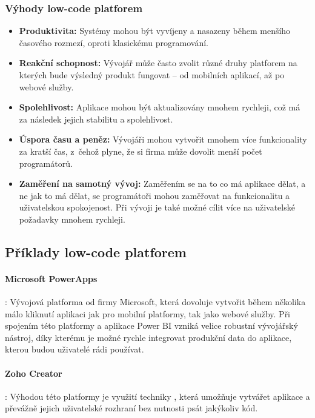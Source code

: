 \subsubsection{Výhody low-code platforem}
\begin{itemize}
\item \textbf{Produktivita:} Systémy mohou být vyvíjeny a nasazeny během menšího časového rozmezí, oproti klasickému programování. \cite{low-code-accelerate}
\item \textbf{Reakční schopnost:} Vývojář může často zvolit různé druhy platforem na kterých bude výsledný produkt fungovat -- od mobilních aplikací, až po webové služby. \cite{low-code-accelerate}
\item \textbf{Spolehlivost:} Aplikace mohou být aktualizovány mnohem rychleji, což má za následek jejich stabilitu a spolehlivost. \cite{low-code-accelerate}
\item \textbf{Úspora času a peněz:} Vývojáři mohou vytvořit mnohem více funkcionality za kratší čas, z~čehož plyne, že si firma může dovolit menší počet programátorů. \cite{low-code-accelerate}
\item \textbf{Zaměření na samotný vývoj:} Zaměřením se na to co má aplikace dělat, a ne jak to má dělat, se programátoři mohou zaměřovat na funkcionalitu a uživatelskou spokojenost. Při vývoji je také možné cílit více na uživatelské požadavky mnohem rychleji. \cite{low-code-accelerate}
\end{itemize}

\subsection{Příklady low-code platforem}
\paragraph{Microsoft PowerApps}: Vývojová platforma od firmy Microsoft, která dovoluje vytvořit během několika málo kliknutí aplikaci jak pro mobilní platformy, tak jako webové služby. Při spojením této platformy a aplikace Power BI vzniká velice robustní vývojářský nástroj, díky kterému je možné rychle integrovat produkční data do aplikace, kterou budou uživatelé rádi používat. \cite{pcmag-no-coding}
\paragraph{Zoho Creator}: Výhodou této platformy je využití techniky , která umožňuje vytvářet aplikace a převážně jejich uživatelské rozhraní bez nutnosti psát jakýkoliv kód. \cite{zoho-review}
